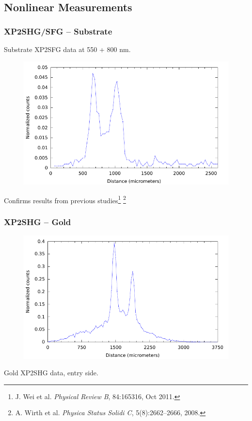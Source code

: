 \documentclass{beamer}
\begin{document}
\subsection{Nonlinear Measurements}
\begin{frame}
\frametitle{XP2SHG/SFG -- Substrate}
\begin{center}
Substrate XP2SFG data at 550 + 800 nm.
\begin{figure}
\includegraphics[height=0.5\textheight]{sub_sfg_550+800}
\end{figure}
Confirms results from previous studies\footnote{J. Wei et al. \emph{Physical Review B}, 84:165316, Oct 2011.} \footnote{A. Wirth et al. \emph{Physica Status Solidi C}, 5(8):2662--2666, 2008.}
\end{center}
\end{frame}

\begin{frame}
\frametitle{XP2SHG -- Gold}
\begin{center}
\begin{figure}
\includegraphics[width=\textwidth]{au_shg_narrow}
\end{figure}
Gold XP2SHG data, entry side.
\end{center}
\end{frame}
\end{document}
